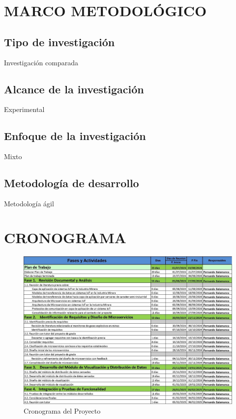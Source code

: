 \documentclass[stu,12pt,floatsintext]{apa7}
\begin{document}
	\section{MARCO METODOLÓGICO}
	\subsection{Tipo de investigación}
	Investigación comparada
	\subsection{Alcance de la investigación}
	Experimental
	\subsection{Enfoque de la investigación}
	Mixto
	\subsection{Metodología de desarrollo}
	Metodología ágil
	
	\section{CRONOGRAMA}
		\begin{figure}[H]
		\centering
		\includegraphics[scale=0.6]{cronograma.jpg}
		\captionsetup{justification=centering}
		\caption{Cronograma del Proyecto}
		\small
		\label{cronograma}
	\end{figure}
\end{document}
